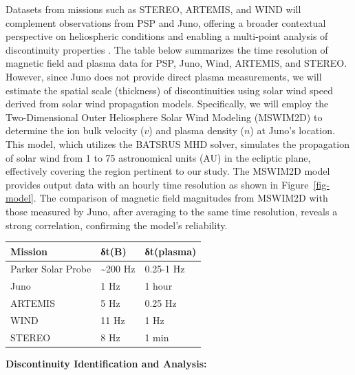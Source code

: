 \documentclass[
  letterpaper,
  DIV=11,
  numbers=noendperiod]{scrartcl}
\begin{document}
Datasets from missions such as STEREO, ARTEMIS, and WIND will complement observations from PSP and Juno, offering a broader contextual perspective on heliospheric conditions and enabling a multi-point analysis of discontinuity properties \citep{velliUnderstandingOriginsHeliosphere2020}. The table below summarizes the time resolution of magnetic field and plasma data for PSP, Juno, Wind, ARTEMIS, and STEREO. However, since Juno does not provide direct plasma measurements, we will estimate the spatial scale (thickness) of discontinuities using solar wind speed derived from solar wind propagation models. Specifically, we will employ the Two-Dimensional Outer Heliosphere Solar Wind Modeling (MSWIM2D) \citep{keeblerMSWIM2DTwodimensionalOuter2022} to determine the ion bulk velocity (\(v\)) and plasma density (\(n\)) at Juno's location. This model, which utilizes the BATSRUS MHD solver, simulates the propagation of solar wind from 1 to 75 astronomical units (AU) in the ecliptic plane, effectively covering the region pertinent to our study. The MSWIM2D model provides output data with an hourly time resolution as shown in Figure~\ref{fig-model}. The comparison of magnetic field magnitudes from MSWIM2D with those measured by Juno, after averaging to the same time resolution, reveals a strong correlation, confirming the model's reliability.

\begin{longtable}[]{@{}lll@{}}
\toprule\noalign{}
Mission & δt(B) & δt(plasma) \\
\midrule\noalign{}
\endhead
\bottomrule\noalign{}
\endlastfoot
Parker Solar Probe & \textasciitilde200 Hz & 0.25-1 Hz \\
Juno & 1 Hz & 1 hour \\
ARTEMIS & 5 Hz & 0.25 Hz \\
WIND & 11 Hz & 1 Hz \\
STEREO & 8 Hz & 1 min \\
\end{longtable}

\textbf{Discontinuity Identification and Analysis:}
\end{document}
